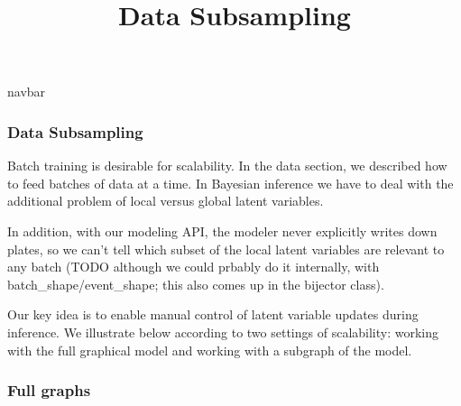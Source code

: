 \title{Data Subsampling}

{{navbar}}

\subsubsection{Data Subsampling}

Batch training is desirable for scalability. In the data section, we
described how to feed batches of data at a time.  In Bayesian
inference we have to deal with the additional problem of local versus
global latent variables.

In addition, with our modeling API, the modeler never explicitly
writes down plates, so we can't tell which subset of the local latent
variables are relevant to any batch (TODO although we could prbably do
it internally, with batch\_shape/event\_shape; this also comes up in
the bijector class).

Our key idea is to enable manual control of latent variable updates
during inference. We illustrate below according to two settings of
scalability: working with the full graphical model and working with a
subgraph of the model.

\subsubsection{Full graphs}

